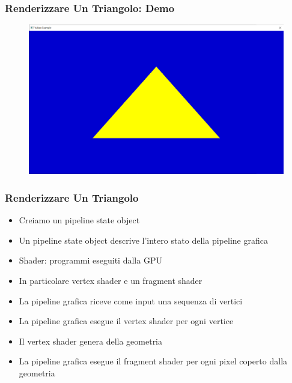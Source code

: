 \begin{frame}
\frametitle{Renderizzare Un Triangolo: Demo}
\begin{figure}[ht]
    \centering
    \includegraphics[scale=0.25]{images/SlidesTriangle/Triangle.png}
\end{figure}
\end{frame}

\begin{frame}
\frametitle{Renderizzare Un Triangolo}
\begin{itemize}
\item Creiamo un pipeline state object
\item Un pipeline state object descrive l'intero stato della pipeline grafica
\item Shader: programmi eseguiti dalla GPU
\item In particolare vertex shader e un fragment shader
\item La pipeline grafica riceve come input una sequenza di vertici
\item La pipeline grafica esegue il vertex shader per ogni vertice
\item Il vertex shader genera della geometria
\item La pipeline grafica esegue il fragment shader per ogni pixel coperto dalla geometria
\end{itemize}
\end{frame}
